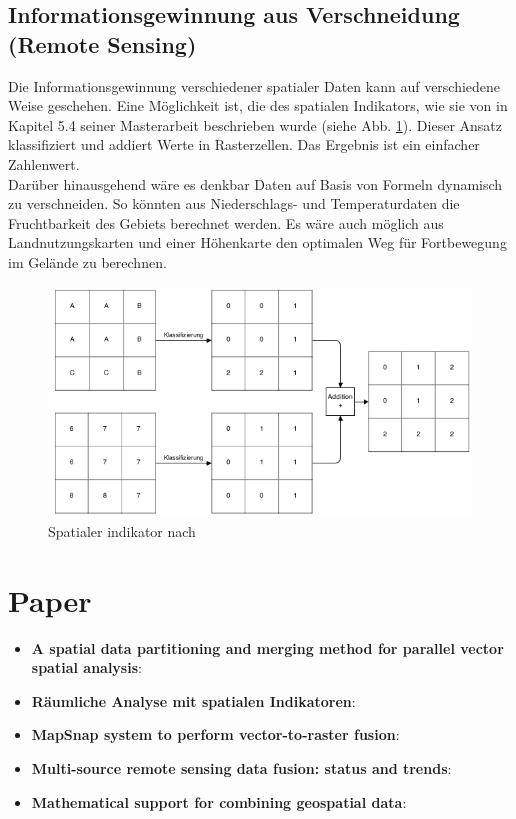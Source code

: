 \subsection{Informationsgewinnung aus Verschneidung (Remote Sensing)}
Die Informationsgewinnung verschiedener spatialer Daten kann auf verschiedene Weise geschehen. Eine Möglichkeit ist, die des spatialen Indikators, wie sie von \cite{Baldowski2014} in Kapitel 5.4 seiner Masterarbeit beschrieben wurde (siehe Abb. \ref{fig:SGI}). Dieser Ansatz klassifiziert und addiert Werte in Rasterzellen. Das Ergebnis ist ein einfacher Zahlenwert.\\
Darüber hinausgehend wäre es denkbar Daten auf Basis von Formeln dynamisch zu verschneiden. So könnten aus Niederschlags- und Temperaturdaten die Fruchtbarkeit des Gebiets berechnet werden. Es wäre auch möglich aus Landnutzungskarten und einer Höhenkarte den optimalen Weg für Fortbewegung im Gelände zu berechnen.
\begin{figure}[H]
	\centering\includegraphics[width=.75\textwidth]{res/Verschneidung}
	\caption{Spatialer indikator nach \cite{Baldowski2014}}
	\label{fig:SGI}
\end{figure}


\section{Paper}
\begin{itemize}
	\item \textbf{A spatial data partitioning and merging method for parallel vector spatial analysis}: \cite{Qiu2015}
	\item \textbf{Räumliche Analyse mit spatialen Indikatoren}: \cite{Baldowski2014}
	\item \textbf{MapSnap system to perform vector-to-raster fusion}: \cite{Kovalerchuk2011}
	\item \textbf{Multi-source remote sensing data fusion: status and trends}: \cite{Zhang2010}
	\item \textbf{Mathematical support for combining geospatial data}: \cite{Kovalerchuk2001}
\end{itemize}
